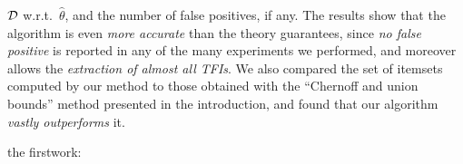 \begin{itemize}
  ${\cal D}$ w.r.t.~$\hat\theta$, and the number of false positives, if any. The
  results show %
  that the algorithm is even \emph{more accurate} than the theory guarantees, since \emph{no
  false positive} %
is reported in any of the many experiments we performed,
  and moreover allows the \emph{extraction of almost all TFIs}. %
  We also
compared the set of itemsets computed by our method to those obtained with the
``Chernoff and union bounds'' method presented in the introduction, and found
that our algorithm \emph{vastly outperforms} it.
\end{itemize}

the firstwork: 
%
%
